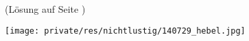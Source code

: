 \begin{multicols}{2}
\hfill(Lösung auf Seite \pageref{pg:rätsel_lösungen})

\begin{center}
	\texttt{[image: private/res/nichtlustig/140729\_hebel.jpg]}
\end{center}
\end{multicols}
